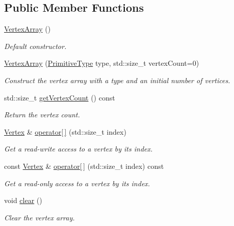 \subsection*{Public Member Functions}
\begin{DoxyCompactItemize}
\item 
\mbox{\hyperlink{classsf_1_1_vertex_array_a15729e01df8fc0021f9774dfb56295c1}{Vertex\+Array}} ()
\begin{DoxyCompactList}\small\item\em Default constructor. \end{DoxyCompactList}\item 
\mbox{\hyperlink{classsf_1_1_vertex_array_a4bb1c29a0e3354a035075899d84f02f9}{Vertex\+Array}} (\mbox{\hyperlink{group__graphics_ga5ee56ac1339984909610713096283b1b}{Primitive\+Type}} type, std\+::size\+\_\+t vertex\+Count=0)
\begin{DoxyCompactList}\small\item\em Construct the vertex array with a type and an initial number of vertices. \end{DoxyCompactList}\item 
std\+::size\+\_\+t \mbox{\hyperlink{classsf_1_1_vertex_array_abda90e8d841a273d93164f0c0032bd8d}{get\+Vertex\+Count}} () const
\begin{DoxyCompactList}\small\item\em Return the vertex count. \end{DoxyCompactList}\item 
\mbox{\hyperlink{classsf_1_1_vertex}{Vertex}} \& \mbox{\hyperlink{classsf_1_1_vertex_array_a6006676417d91f42d0278f1abcfe4352}{operator\mbox{[}$\,$\mbox{]}}} (std\+::size\+\_\+t index)
\begin{DoxyCompactList}\small\item\em Get a read-\/write access to a vertex by its index. \end{DoxyCompactList}\item 
const \mbox{\hyperlink{classsf_1_1_vertex}{Vertex}} \& \mbox{\hyperlink{classsf_1_1_vertex_array_a6bfcf91c01c754e86ee8b44b6c79441b}{operator\mbox{[}$\,$\mbox{]}}} (std\+::size\+\_\+t index) const
\begin{DoxyCompactList}\small\item\em Get a read-\/only access to a vertex by its index. \end{DoxyCompactList}\item 
void \mbox{\hyperlink{classsf_1_1_vertex_array_a3654c424aca1f9e468f369bc777c839c}{clear}} ()
\begin{DoxyCompactList}\small\item\em Clear the vertex array. \end{DoxyCompactList}\item 

\end{DoxyCompactItemize}
